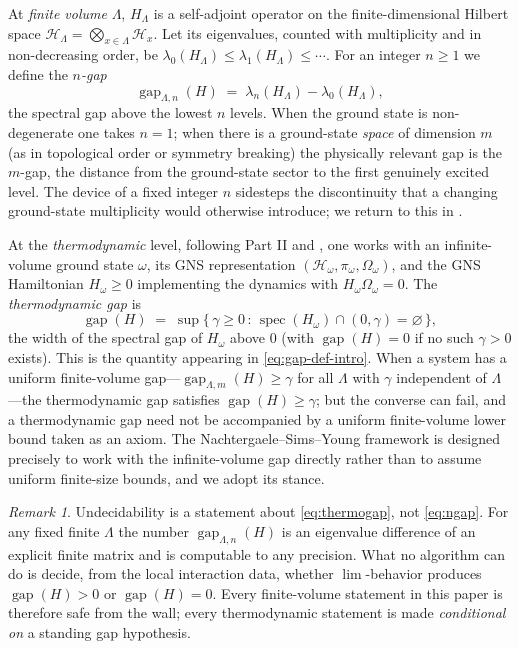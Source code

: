 \documentclass[12pt]{article}
\newcommand{\gapof}[1]{\operatorname{gap}(#1)} %
\newcommand{\Hilb}{\mathcal{H}}
\newcommand{\set}[1]{\{\,#1\,\}}
\newcommand{\gapfin}[1]{\operatorname{gap}_{#1}}
\theoremstyle{plain}
\theoremstyle{definition}
\theoremstyle{remark}
\newtheorem{remark}[remark]{Remark}
\begin{document}
At \emph{finite volume} $\Lambda$, $H_\Lambda$ is a self-adjoint operator on the
finite-dimensional Hilbert space $\Hilb_\Lambda=\bigotimes_{x\in\Lambda}\Hilb_x$. Let
its eigenvalues, counted with multiplicity and in non-decreasing order, be
$\lambda_0(H_\Lambda)\le\lambda_1(H_\Lambda)\le\cdots$. For an integer $n\ge 1$ we
define the \emph{$n$-gap}
\begin{equation}
\label{eq:ngap}
\gapfin{\Lambda,n}(H)\;=\;\lambda_n(H_\Lambda)-\lambda_0(H_\Lambda),
\end{equation}
the spectral gap above the lowest $n$ levels. When the ground state is non-degenerate
one takes $n=1$; when there is a ground-state \emph{space} of dimension $m$ (as in
topological order or symmetry breaking) the physically relevant gap is the
$m$-gap, the distance from the ground-state sector to the first genuinely excited
level. The device of a fixed integer $n$ sidesteps the discontinuity that a changing
ground-state multiplicity would otherwise introduce; we return to this in
.

At the \emph{thermodynamic} level, following Part II and
\cite{ogata-classification-review,nsy-bulkgap}, one works with an infinite-volume
ground state $\omega$, its GNS representation $(\Hilb_\omega,\pi_\omega,\Omega_\omega)$,
and the GNS Hamiltonian $H_\omega\ge 0$ implementing the dynamics with
$H_\omega\Omega_\omega=0$. The \emph{thermodynamic gap} is
\begin{equation}
\label{eq:thermogap}
\gapof{H}\;=\;\sup\set{\gamma\ge 0\,:\,\operatorname{spec}(H_\omega)\cap(0,\gamma)=\varnothing},
\end{equation}
the width of the spectral gap of $H_\omega$ above $0$ (with $\gapof{H}=0$ if no such
$\gamma>0$ exists). This is the quantity appearing in \eqref{eq:gap-def-intro}. When a
system has a uniform finite-volume gap---$\gapfin{\Lambda,m}(H)\ge\gamma$ for all
$\Lambda$ with $\gamma$ independent of $\Lambda$---the thermodynamic gap satisfies
$\gapof{H}\ge\gamma$; but the converse can fail, and a thermodynamic gap need not be
accompanied by a uniform finite-volume lower bound taken as an axiom. The
Nachtergaele--Sims--Young framework \cite{nsy-bulkgap} is designed precisely to work
with the infinite-volume gap directly rather than to assume uniform finite-size
bounds, and we adopt its stance.

\begin{remark}
\label{rem:cpw-finite}
Undecidability \cite{cpw-undecidable} is a statement about \eqref{eq:thermogap}, not
\eqref{eq:ngap}. For any fixed finite $\Lambda$ the number $\gapfin{\Lambda,n}(H)$ is
an eigenvalue difference of an explicit finite matrix and is computable to any
precision. What no algorithm can do is decide, from the local interaction data,
whether $\lim$-behavior produces $\gapof{H}>0$ or $\gapof{H}=0$. Every finite-volume
statement in this paper is therefore safe from the wall; every thermodynamic
statement is made \emph{conditional on} a standing gap hypothesis.
\end{remark}
\end{document}

